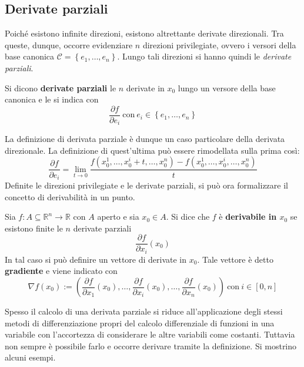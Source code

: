 \subsection{Derivate parziali}
Poiché esistono infinite direzioni, esistono altrettante derivate direzionali. Tra queste, dunque, occorre evidenziare $n$ direzioni privilegiate, ovvero i versori della base canonica $\mathcal{C}=\left\{e_1,\dots, e_n\right\}$. Lungo tali direzioni si hanno quindi le \textit{derivate parziali}.
\begin{definition} \label{Def: Derivate parziali}
    Si dicono \textbf{derivate parziali} le $n$ derivate in $x_0$ lungo un versore della base canonica e le si indica con
    \begin{equation}
        \frac{\partial{f}}{\partial{e_i}}\ \text{con}\ e_i \in \left\{e_1,\dots, e_n\right\}
    \end{equation} 
\end{definition}
La definizione di derivata parziale è dunque un caso particolare della derivata direzionale. La definizione di quest'ultima può essere rimodellata sulla prima così:
\begin{equation}
    \frac{\partial{f}}{\partial{e_i}}=\lim_{t \to 0}{\frac{f(x_0^1, \dots, x_0^i+t, \dots, x_0^n)-f(x_0^1, \dots, x_0^i, \dots, x_0^n)}{t}}
\end{equation}
Definite le direzioni privilegiate e le derivate parziali, si può ora formalizzare il concetto di derivabilità in un punto.
\begin{definition} \label{Def: Derivabilità}
    Sia $f:A \subseteq \mathbb{R}^n \to \mathbb{R}$ con $A$ aperto e sia $x_0 \in A$. Si dice che $f$ è \textbf{derivabile in $x_0$} se esistono finite le $n$ derivate parziali
    \begin{equation}
        \frac{\partial{f}}{\partial{x_i}}(x_0)
    \end{equation}
In tal caso si può definire un vettore di derivate in $x_0$. Tale vettore è detto \textbf{gradiente} e viene indicato con
\begin{equation}
    \nabla f(x_0) := \left(\frac{\partial{f}}{\partial{x_1}}(x_0), \dots, \frac{\partial{f}}{\partial{x_i}}(x_0), \dots, \frac{\partial{f}}{\partial{x_n}}(x_0)\right)\ \text{con}\ i \in [0,n]
\end{equation}
\end{definition}
Spesso il calcolo di una derivata parziale si riduce all'applicazione degli stessi metodi di differenziazione propri del calcolo differenziale di funzioni in una variabile con l'accortezza di considerare le altre variabili come costanti. Tuttavia non sempre è possibile farlo e occorre derivare tramite la definizione. Si mostrino alcuni esempi.
